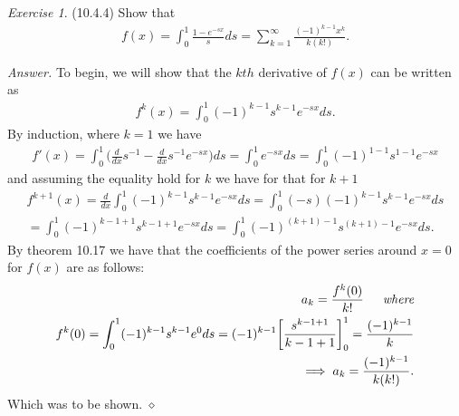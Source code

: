 \documentclass[12pt,oneside]{amsart}
\theoremstyle{definition}
\theoremstyle{remark}
\newtheorem{exer}{Exercise}
\numberwithin{equation}{exer}
\newenvironment{answer}{\bigskip\noindent\emph{Answer.}}{\hfill$\diamond$\newline}
\newcommand{\ite}{\int_0^1}
\begin{document}
\newpage \indent \newline
\begin{exer} (10.4.4)
\indent Show that 
\begin{align*}
    f(x) = \ite \frac{1 - e^{-sx}}{s} ds =
    \sum_{k=1}^\infty \frac{(-1)^{k-1}x^k}{k(k!)} .
\end{align*}
\end{exer}
\begin{answer}
\indent To begin, we will show that the $kth$ derivative of $f(x)$ can be written as 
\begin{align*}
    f^k(x) = \ite (-1)^{k-1} s^{k-1} e^{-sx}ds.
\end{align*}
By induction, where $k=1$ we have
\begin{align*}
    f'(x) = \ite \big(\frac{d}{dx}s^{-1} - \frac{d}{dx} s^{-1} e^{-sx} \big)ds = \ite e^{-sx}ds = \ite (-1)^{1-1} s ^{1-1} e^{-sx}
\end{align*}
and assuming the equality hold for $k$ we have for that for $k+1$
\begin{align*}
    f^{k+1}(x) = \frac{d}{dx} \ite (-1)^{k-1}s^{k-1} e^{-sx}ds = \ite (-s)(-1)^{k-1}s^{k-1} e^{-sx}ds \\
    = \ite (-1)^{k-1 +1}s^{k-1+1} e^{-sx}ds = \ite (-1)^{(k+1) -1}s^{(k+1)-1} e^{-sx}ds.
\end{align*}    
By theorem 10.17 we have that the coefficients of the power series around $x=0$ for $f(x)$ are as follows:
\begin{align*}
    a_k=\frac{f^k(0)}{k!} \indent \textit{where}\\
    f^k(0) = \ite (-1)^{k-1}s^{k-1} e^0 ds = (-1)^{k-1} \bigg[\frac{s^{k-1+1}}{k-1+1}\bigg]_0^1 = \frac{(-1)^{k-1}}{k}\\
    \implies a_k = \frac{(-1)^{k-1}}{k(k!)}.
\end{align*}
Which was to be shown.
\end{answer}
\end{document}
